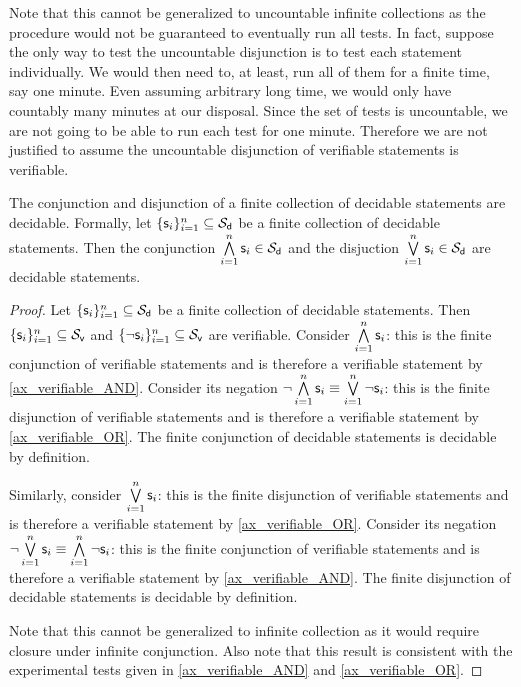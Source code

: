 \documentclass[11pt,letterpaper,fleqn]{memoir} %
\begin{document}
\begin{mathSection}
\begin{justification}
		Note that this cannot be generalized to uncountable infinite collections as the procedure would not be guaranteed to eventually run all tests. In fact, suppose the only way to test the uncountable disjunction is to test each statement individually. We would then need to, at least, run all of them for a finite time, say one minute. Even assuming arbitrary long time, we would only have countably many minutes at our disposal. Since the set of tests is uncountable, we are not going to be able to run each test for one minute. Therefore we are not justified to assume the uncountable disjunction of verifiable statements is verifiable.
	\end{justification}
	\begin{prop}\label{prop_decidable_AND_OR}
		The conjunction and disjunction of a finite collection of decidable statements are decidable. Formally, let $\{\mathsf{s}_i\}_{i=1}^{n} \subseteq \mathcal{S}_\textsf{d}$ be a finite collection of decidable statements. Then the conjunction $\bigwedge\limits_{i=1}^{n} \mathsf{s}_i \in \mathcal{S}_\textsf{d}$ and the disjuction $\bigvee\limits_{i=1}^{n} \mathsf{s}_i \in \mathcal{S}_\textsf{d}$ are decidable statements.
	\end{prop}
\begin{proof}
	Let $\{\mathsf{s}_i\}_{i=1}^{n} \subseteq \mathcal{S}_\textsf{d}$ be a finite collection of decidable statements. Then $\{\mathsf{s}_i\}_{i=1}^{n} \subseteq \mathcal{S}_\textsf{v}$ and $\{\neg\mathsf{s}_i\}_{i=1}^{n} \subseteq \mathcal{S}_\textsf{v}$ are verifiable. Consider $\bigwedge\limits_{i=1}^{n} \mathsf{s}_i$: this is the finite conjunction of verifiable statements and is therefore a verifiable statement by \ref{ax_verifiable_AND}. Consider its negation $\neg \bigwedge\limits_{i=1}^{n} \mathsf{s}_i \equiv \bigvee\limits_{i=1}^{n} \neg \mathsf{s}_i$: this is the finite disjunction of verifiable statements and is therefore a verifiable statement by \ref{ax_verifiable_OR}. The finite conjunction of decidable statements is decidable by definition.
	
	Similarly, consider $\bigvee\limits_{i=1}^{n} \mathsf{s}_i$: this is the finite disjunction of verifiable statements and is therefore a verifiable statement by \ref{ax_verifiable_OR}. Consider its negation $\neg \bigvee\limits_{i=1}^{n} \mathsf{s}_i \equiv \bigwedge\limits_{i=1}^{n} \neg \mathsf{s}_i$: this is the finite conjunction of verifiable statements and is therefore a verifiable statement by \ref{ax_verifiable_AND}. The finite disjunction of decidable statements is decidable by definition.
	
	Note that this cannot be generalized to infinite collection as it would require closure under infinite conjunction. Also note that this result is consistent with the experimental tests given in \ref{ax_verifiable_AND} and \ref{ax_verifiable_OR}.
\end{proof}
\end{mathSection}
\end{document}
